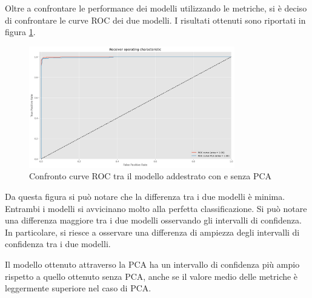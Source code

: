 Oltre a confrontare le performance dei modelli utilizzando le metriche, si
è deciso di confrontare le curve ROC dei due modelli. I risultati ottenuti sono
riportati in figura \ref{fig:confrontoRisultatiPCA}.

\begin{figure}[!ht]
    \centering
    \includegraphics[width=0.8\textwidth]{img/rete/confrontoRoc.png}
    \caption{Confronto curve ROC tra il modello addestrato con e senza PCA}
    \label{fig:confrontoRisultatiPCA}
\end{figure}

Da questa figura si può notare che la differenza tra i due modelli è minima.
Entrambi i modelli si avvicinano molto alla perfetta classificazione. Si può
notare una differenza maggiore tra i due modelli osservando gli intervalli di
confidenza. In particolare, si riesce a osservare una differenza di ampiezza
degli intervalli di confidenza tra i due modelli.

Il modello ottenuto attraverso la PCA ha un intervallo di confidenza più ampio
rispetto a quello ottenuto senza PCA, anche se il valore medio delle metriche
è leggermente superiore nel caso di PCA.


